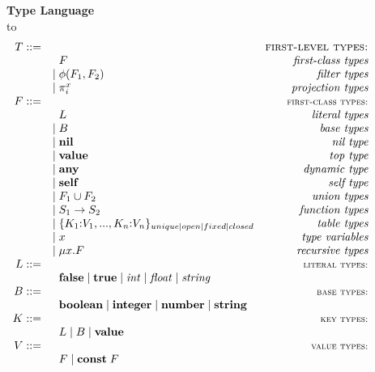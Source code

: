 \documentclass{sigplanconf}
\newcommand{\Value}{\mathbf{value}}
\newcommand{\Any}{\mathbf{any}}
\newcommand{\Nil}{\mathbf{nil}}
\newcommand{\Self}{\mathbf{self}}
\newcommand{\False}{\mathbf{false}}
\newcommand{\True}{\mathbf{true}}
\newcommand{\Boolean}{\mathbf{boolean}}
\newcommand{\Integer}{\mathbf{integer}}
\newcommand{\Number}{\mathbf{number}}
\newcommand{\String}{\mathbf{string}}
\newcommand{\Const}{\mathbf{const}}
\def\dstart{\hbox to \hsize{\vrule depth 4pt\hrulefill\vrule depth 4pt}}
\begin{document}
\begin{figure*}[!ht]
\textbf{Type Language}\\
\dstart
$$
\begin{array}{rlr}
T ::= & & \textsc{first-level types:}\\
& \;\; F & \textit{first-class types}\\
& | \; \phi(F_{1},F_{2}) & \textit{filter types}\\
& | \; \pi_{i}^{x} & \textit{projection types}\\
F ::= & & \textsc{{\small first-class types:}}\\
& \;\; L & \textit{literal types}\\
& | \; B & \textit{base types}\\
& | \; \Nil & \textit{nil type}\\
& | \; \Value & \textit{top type}\\
& | \; \Any & \textit{dynamic type}\\
& | \; \Self & \textit{self type}\\
& | \; F_{1} \cup F_{2} & \textit{union types}\\
& | \; S_{1} \rightarrow S_{2} & \textit{function types}\\
& | \; \{K_{1}{:}V_{1}, ..., K_{n}{:}V_{n}\}_{unique|open|fixed|closed} & \textit{table types}\\
& | \; x & \textit{type variables}\\
& | \; \mu x.F & \textit{recursive types}\\
L ::= & & \textsc{{\small literal types:}}\\
& \;\; \False \; | \; \True \; | \; {\it int} \; | \; {\it float} \; | \; {\it string} &\\
B ::= & & \textsc{{\small base types:}}\\
& \;\; \Boolean \; | \; \Integer \; | \; \Number \; | \; \String &\\
K ::= & & \textsc{{\small key types:}}\\
& \;\; L \; | \; B \; | \; \Value &\\
V ::= & & \textsc{{\small value types:}}\\
& \;\; F \; | \; \Const \; F &\\ 

\end{array}$$
\end{figure*}
\end{document}

